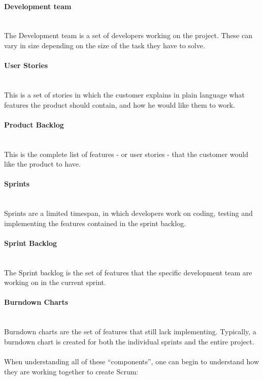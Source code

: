 \paragraph{Development team}\ \\
The Development team is a set of developers working on the project. These can vary in size depending on the size of the task they have to solve.

\paragraph{User Stories}\ \\
This is a set of stories in which the customer explains in plain language what features the product should contain, and how he would like them to work.

\paragraph{Product Backlog}\ \\
This is the complete list of features - or user stories - that the customer would like the product to have.

\paragraph{Sprints}\ \\
Sprints are a limited timespan, in which developers work on coding, testing and implementing the features contained in the sprint backlog.

\paragraph{Sprint Backlog}\ \\
The Sprint backlog is the set of features that the specific development team are working on in the current sprint.

\paragraph{Burndown Charts}\ \\
Burndown charts are the set of features that still lack implementing. Typically, a burndown chart is created for both the individual sprints and the entire project.\\
 \\
When understanding all of these ``components'', one can begin to understand how they are working together to create Scrum:


